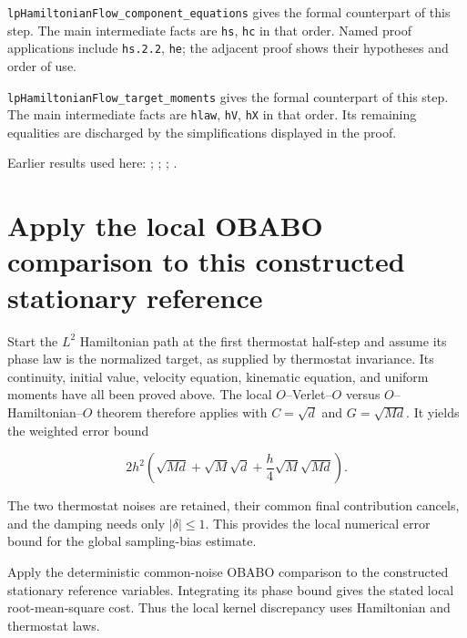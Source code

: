 \documentclass[11pt,a4paper]{article}
\begin{document}
\begin{leanbox}
\texttt{lp\allowbreak{}Hamiltonian\allowbreak{}Flow\_\allowbreak{}component\_\allowbreak{}equations} gives the formal counterpart of this step. The main intermediate facts are \texttt{hs}, \texttt{hc} in that order. Named proof applications include \texttt{hs.\allowbreak{}2.\allowbreak{}2}, \texttt{he}; the adjacent proof shows their hypotheses and order of use.




\texttt{lp\allowbreak{}Hamiltonian\allowbreak{}Flow\_\allowbreak{}target\_\allowbreak{}moments} gives the formal counterpart of this step. The main intermediate facts are \texttt{hlaw}, \texttt{h\allowbreak{}V}, \texttt{h\allowbreak{}X} in that order. Its remaining equalities are discharged by the simplifications displayed in the proof.
\end{leanbox}


Earlier results used here: \cite[Section~3.13.2]{LangevinLean2026ULASC}; \cite[Section~3.13.5]{LangevinLean2026ULASC}; \cite[Section~3.26.3]{LangevinLean2026ULASC}; \cite[Section~3.28.2]{LangevinLean2026ULASC}.

\section{\texorpdfstring{Apply the local OBABO comparison to this constructed stationary reference}{Apply the local OBABO comparison to this constructed stationary reference}}


Start the \(L^{2}\) Hamiltonian path at the first thermostat half-step and assume its phase law is the normalized target, as supplied by thermostat invariance. Its continuity, initial value, velocity equation, kinematic equation, and uniform moments have all been proved above. The local \(O\)–Verlet–\(O\) versus \(O\)–Hamiltonian–\(O\) theorem therefore applies with \(C=\sqrt d\) and \(G=\sqrt{Md}\). It yields the weighted error bound

\[2h^2\left(\sqrt{Md}+\sqrt M\sqrt d+\frac{h}{4}\sqrt M\sqrt{Md}\right).\]

The two thermostat noises are retained, their common final contribution cancels, and the damping needs only \(|\delta|\le1\). This provides the local numerical error bound for the global sampling-bias estimate.



Apply the deterministic common-noise OBABO comparison to the constructed stationary reference variables. Integrating its phase bound gives the stated local root-mean-square cost. Thus the local kernel discrepancy uses Hamiltonian and thermostat laws.
\end{document}

